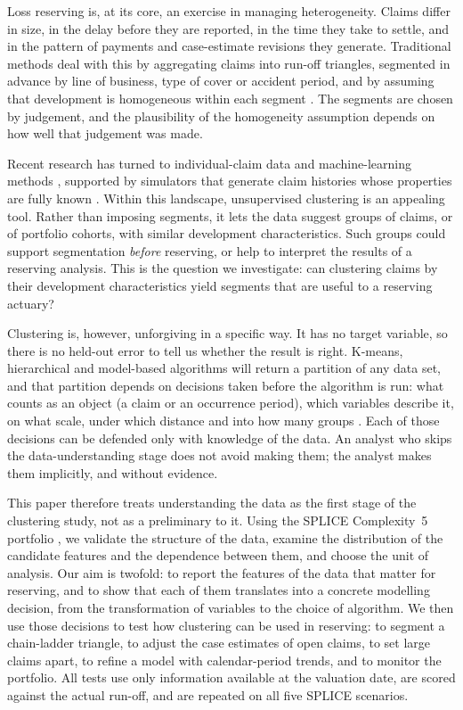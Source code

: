 \documentclass[
    a4paper,
    man,
    floatsintext
]{style}
\begin{document}
Loss reserving is, at its core, an exercise in managing heterogeneity. Claims differ in size, in the delay before they are reported, in the time they take to settle, and in the pattern of payments and case-estimate revisions they generate. Traditional methods deal with this by aggregating claims into run-off triangles, segmented in advance by line of business, type of cover or accident period, and by assuming that development is homogeneous within each segment \parencite{taylor2000loss,england2002stochastic}. The segments are chosen by judgement, and the plausibility of the homogeneity assumption depends on how well that judgement was made.

Recent research has turned to individual-claim data and machine-learning methods \parencite{wuthrich2018machine}, supported by simulators that generate claim histories whose properties are fully known \parencite{avanzi2021synthetic,avanzi2023splice}. Within this landscape, unsupervised clustering is an appealing tool. Rather than imposing segments, it lets the data suggest groups of claims, or of portfolio cohorts, with similar development characteristics. Such groups could support segmentation \emph{before} reserving, or help to interpret the results of a reserving analysis. This is the question we investigate: can clustering claims by their development characteristics yield segments that are useful to a reserving actuary?

Clustering is, however, unforgiving in a specific way. It has no target variable, so there is no held-out error to tell us whether the result is right. K-means, hierarchical and model-based algorithms will return a partition of any data set, and that partition depends on decisions taken before the algorithm is run: what counts as an object (a claim or an occurrence period), which variables describe it, on what scale, under which distance and into how many groups \parencite{jain2010data,hastie2009elements}. Each of those decisions can be defended only with knowledge of the data. An analyst who skips the data-understanding stage does not avoid making them; the analyst makes them implicitly, and without evidence.

This paper therefore treats understanding the data as the first stage of the clustering study, not as a preliminary to it. Using the SPLICE Complexity~5 portfolio \parencite{avanzi2023splice}, we validate the structure of the data, examine the distribution of the candidate features and the dependence between them, and choose the unit of analysis. Our aim is twofold: to report the features of the data that matter for reserving, and to show that each of them translates into a concrete modelling decision, from the transformation of variables to the choice of algorithm. We then use those decisions to test how clustering can be used in reserving: to segment a chain-ladder triangle, to adjust the case estimates of open claims, to set large claims apart, to refine a model with calendar-period trends, and to monitor the portfolio. All tests use only information available at the valuation date, are scored against the actual run-off, and are repeated on all five SPLICE scenarios.
\end{document}
